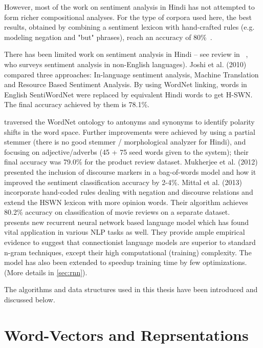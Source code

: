 However, most of the work on sentiment analysis in Hindi has not attempted to form richer compositional analyses.   For the type of corpora used here, the best results, obtained by combining a sentiment lexicon with hand-crafted rules (e.g. modeling negation and "but" phrases), reach an accuracy of 80\%~\cite{Mittal:13}.

There has been limited work on sentiment analysis in Hindi -- see review in
~\cite{Medagoda:13}, who surveys sentiment analysis in non-English languages). Joshi et al. (2010) compared three approaches: In-language sentiment
analysis, Machine Translation and Resource Based Sentiment Analysis. By using WordNet linking, words in English SentiWordNet were replaced by equivalent Hindi words to get H-SWN. The final accuracy achieved by them is 78.1\%.

\cite{Bakliwal:12}
traversed the WordNet ontology to antonyms and synonyms 
to identify polarity shifts in the word space. Further
improvements were achieved by using a partial stemmer (there is no good
stemmer / morphological analyzer for Hindi), and focusing on 
adjective/adverbs (45 + 75 seed words given to the system); their 
final accuracy was 79.0\% for the product review dataset. 
Mukherjee et al. (2012) presented the inclusion of discourse markers in a bag-of-words model and how it improved the sentiment classification accuracy by 2-4\%.  %
Mittal et al. (2013) incorporate hand-coded rules dealing with negation and discourse relations and extend the HSWN lexicon with more opinion words.  Their algorithm achieves  80.2\%
accuracy on classification of movie reviews on a separate dataset.\\

\cite{Mikolov:10} presents new recurrent neural network based language model which has found vital application in various NLP tasks as well. They provide ample empirical evidence to suggest that connectionist language models are superior to standard n-gram techniques, except their high computational (training) complexity. The model has also been extended to speedup training time by few optimizations.(More details in \ref{sec:rnn}).

The algorithms and data structures used in this thesis have been introduced and discussed below.
\section{Word-Vectors and Reprsentations}
